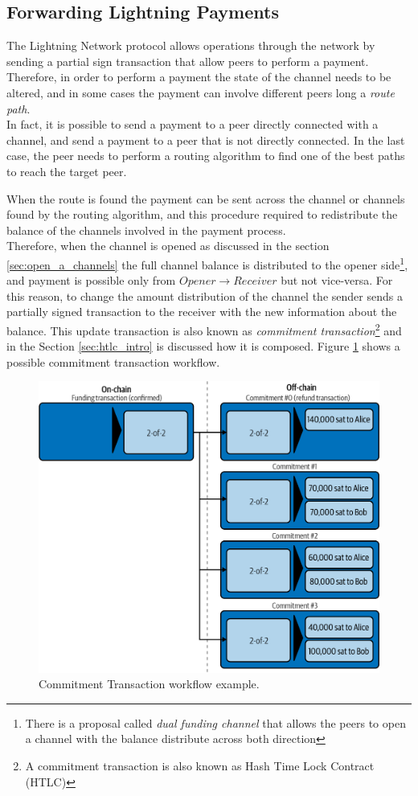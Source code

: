 \subsection{Forwarding Lightning Payments}

The Lightning Network protocol allows operations through the network by sending a partial sign transaction that
allow peers to perform a payment.
Therefore, in order to perform a payment the state of the channel needs to be altered, and in some cases the payment can involve
different peers long a \emph{route path}.\\
In fact, it is possible to send a payment to a peer directly connected with a channel, and send a payment to a peer
that is not directly connected. In the last case, the peer needs to perform a routing algorithm
to find one of the best paths to reach the target peer.

When the route is found the payment can be sent across the channel or channels found by the routing algorithm, and this procedure
required to redistribute the balance of the channels involved in the payment process.\\
Therefore, when the channel is opened as discussed in the section \ref{sec:open_a_channels} the full channel balance
is distributed to the opener side\footnote{There is a proposal called \emph{dual funding channel} that allows the peers to open a channel
  with the balance distribute across both direction},
and payment is possible only from $Opener \rightarrow Receiver$ but not vice-versa. For this reason, to change the amount distribution
of the channel the sender sends a partially signed transaction to the receiver with the new information about the balance.
This update transaction is also known as \emph{commitment transaction}\footnote{A commitment transaction is also known as Hash Time Lock Contract (HTLC)} and in the Section \ref{sec:htlc_intro} is discussed how it is composed.
Figure \ref{fig:commitment_transaction_example} shows a possible commitment transaction workflow.

\begin{figure}[h]
  \begin{center}
  \includegraphics[width=0.6\columnwidth]{imgs/mtln_0706.png}
  \end{center}
  \caption{Commitment Transaction workflow example.}
  \label{fig:commitment_transaction_example}
\end{figure}


